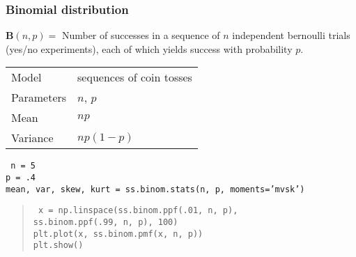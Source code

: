 \begin{frame}
  \frametitle{Binomial distribution}

  $\mathbf{B}(n,p) = $ Number of successes in a sequence of $n$ independent bernoulli
  trials (yes/no experiments), each of which yields success with
  probability $p$.
  \bigskip

  \begin{tabular}{l|l}
    Model & sequences of coin tosses\\[1mm]
    Parameters & $n$, $p$\\[1mm]
    Mean & $np$\\[1mm]
    Variance & $np(1-p)$
  \end{tabular}

  \vspace{6mm}
   {
    \tt
    n = 5\\
    p = .4\\
    mean, var, skew, kurt = ss.binom.stats(n, p, moments='mvsk')

  }
   {
    \begin{quote}
      \tt
      x = np.linspace(ss.binom.ppf(.01, n, p), \\
      \hspace{1cm} ss.binom.ppf(.99, n, p), 100) \\
      plt.plot(x, ss.binom.pmf(x, n, p)) \\
      plt.show()
    \end{quote}

    \cnote {  }
  }


  
  
\end{frame}

